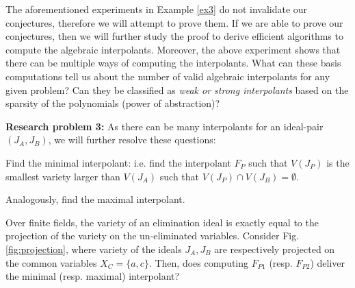 The aforementioned experiments in Example \ref{ex3} do not invalidate
our conjectures, therefore we will attempt to prove them. If we are
able to prove our conjectures, then we will further study the proof to
derive efficient algorithms to compute the algebraic
interpolants. Moreover, the above experiment shows that there can be
multiple ways of computing the interpolants. What can these \Grobner
basis computations tell us about the number of valid algebraic
interpolants for any given problem? Can they be classified as {\it weak
  or strong interpolants} based on the sparsity of the polynomials
(power of abstraction)? 

{\bf Research problem 3:}
As there can be many interpolants for an ideal-pair $(J_A, J_B)$, we
will further resolve these questions:
\bi
\item Find the minimal interpolant: i.e. find the interpolant $F_P$
  such that $V(J_P)$ is the smallest variety larger than $V(J_A)$ such
  that $V(J_P) \cap V(J_B) = \emptyset$.
\item Analogously, find the maximal interpolant. 
\item Over finite fields, the variety of an elimination ideal is
  exactly equal to the projection of the variety on the un-eliminated
  variables. Consider Fig. \ref{fig:projection}, where variety of the
  ideals $J_A, J_B$ are respectively projected on the common variables
  $X_C = \{a, c\}$. Then, does computing $F_{P1}$ (resp. $F_{P2}$) 
  deliver the minimal (resp. maximal) interpolant?
\ei

\begin{figure}[h]
\end{figure}


